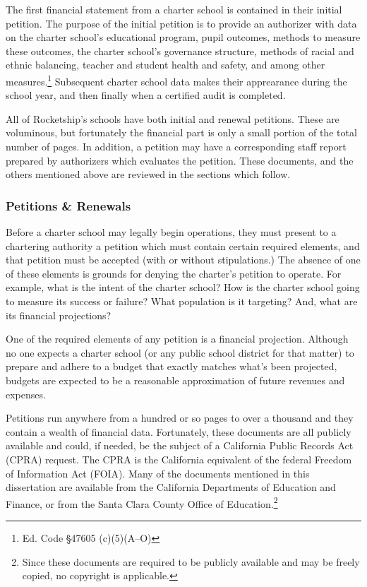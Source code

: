 The first financial statement from a charter school is contained in their initial petition. The purpose of the initial petition is to provide an authorizer with data on the charter school's educational program, pupil outcomes, methods to measure these outcomes, the charter school's governance structure, methods of racial and ethnic balancing, teacher and student health and safety, and among other measures.\footnote{Ed. Code §47605 (c)(5)(A–O)} Subsequent charter school data makes their apprearance during the school year, and then finally when a certified audit is completed.

All of Rocketship's schools have both initial and renewal petitions. These are voluminous, but fortunately the financial part is only a small portion of the total number of pages. In addition, a petition may have a corresponding staff report prepared by authorizers which evaluates the petition. These documents, and the others mentioned above are reviewed in the sections which follow.

\newpage
\subsubsection{Petitions \& Renewals}\label{sec:cs-petitions-renewals}\indent%

Before a charter school may legally begin operations, they must present to a chartering authority a petition which must contain certain required elements, and that petition must be accepted (with or without stipulations.) The absence of one of these elements is grounds for denying the charter's petition to operate. For example, what is the intent of the charter school? How is the charter school going to measure its success or failure? What population is it targeting? And, what are its financial projections? 

One of the required elements of any petition is a financial projection. Although no one expects a charter school (or any public school district for that matter) to prepare and adhere to a budget that exactly matches what's been projected, budgets are expected to be a reasonable approximation of future revenues and expenses.

Petitions run anywhere from a hundred or so pages to over a thousand and they contain a wealth of financial data. Fortunately, these documents are all publicly available and could, if needed, be the subject of a California Public Records Act (CPRA) request. The CPRA is the California equivalent of the federal Freedom of Information Act (FOIA). Many of the documents mentioned in this dissertation are available from the California Departments of Education and Finance, or from the Santa Clara County Office of Education.\footnote{Since these documents are required to be publicly available and may be freely copied, no copyright is applicable.}

